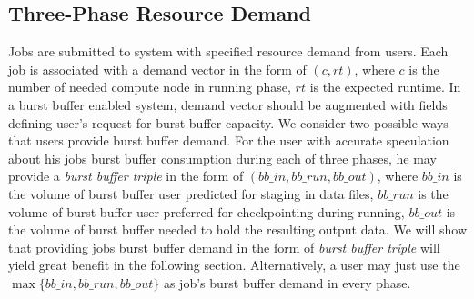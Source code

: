\subsection{Three-Phase Resource Demand}

Jobs are submitted to system with specified resource demand from users. 
Each job is associated with a demand vector in the form of $(c, rt)$, 
where $c$ is the number of needed compute node in running phase,
$rt$ is the expected runtime. 
In a burst buffer enabled system, demand vector should be augmented
with fields defining user's request for burst buffer capacity.
We consider two possible ways that users provide burst buffer demand.
For the user with accurate speculation about his jobs burst buffer consumption during each of three phases,
he may provide a \textit{burst buffer triple} in the form of $(bb\_in, bb\_run, bb\_out)$,
where $bb\_in$ is the volume of burst buffer user predicted for staging in data files,
$bb\_run$ is the volume of burst buffer user preferred for checkpointing during running,
$bb\_out$ is the volume of burst buffer needed to hold the resulting output data.
We will show that providing jobs burst buffer demand in the form of \textit{burst buffer triple} 
will yield great benefit in the following section.
Alternatively, a user may just use the $\max\{bb\_in, bb\_run, bb\_out\}$ 
as job's burst buffer demand in every phase. 

